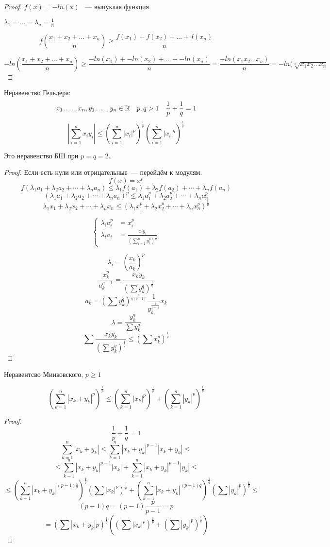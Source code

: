 \begin{proof}
$f(x) = -ln(x)$ ~--- выпуклая функция.

$\lambda_1 = \ldots = \lambda_n = \frac1n$

$$f(\frac{x_1 + x_2 + \ldots + x_n}{n}) \ge \frac{f(x_1) + f(x_2) + \ldots + f(x_n)}{n}$$

$$-ln(\frac{x_1 + x_2 + \ldots + x_n}{n}) \ge \frac{-ln(x_1) + -ln(x_2) + \ldots + -ln(x_n)}{n} = \frac{-ln(x_1x_2\ldots x_n)}{n} = -ln(\sqrt[n]{x_1x_2\ldots x_n}$$


\end{proof}
\begin{conseq}
Неравенство Гельдера:
$$x_1, \ldots, x_n, y_1, \ldots, y_n \in \mathbb{R} \quad p,q > 1 \quad \frac1p + \frac1q = 1$$
$$\left|\sum_{i=1}^n x_iy_i\right| \leqslant \left(\sum_{i=1}^n |x_i|^p\right)^{\frac1p} \left(\sum_{i=1}^n |x_i|^q\right)^{\frac1q}$$
\end{conseq}
\begin{Rem}
Это неравенство БШ при $p=q=2$.
\end{Rem}
\begin{proof}
Если есть нули или отрицательные~--- перейдём к модулям.
$$f(x) = x^p$$
$$f\left( \lambda_1a_1 + \lambda_2a_2 + \cdots + \lambda_n a_n \right) \leqslant \lambda_1f(a_1) + \lambda_2f(a_2) + \cdots + \lambda_nf(a_n)$$
$$\left( \lambda_1a_1 + \lambda_2a_2 + \cdots + \lambda_n a_n \right)^p \leqslant \lambda_1 a_1^p + \lambda_2 a_2^p + \cdots + \lambda_n a_n^p$$
$$\lambda_1x_1 + \lambda_2x_2 + \cdots + \lambda_n x_n \leqslant \left(\lambda_1 x_1^p + \lambda_2 x_2^p + \cdots + \lambda_n x_n^p \right)^{\frac1p}$$

$$ \left\{\begin{aligned}
\lambda_i a_i^p &= x_i^p \\
\lambda_i a_i &= \frac{x_iy_i}{(\sum_{i=1}^n y_i^p) ^ {\frac1q}}
\end{aligned}\right.$$

$$\lambda_i  = (\frac{x_k}{a_k})^p$$ 
$$\frac{x_k^{p}}{a_k^{p - 1}} =\frac{x_k y_k}{(\sum y_k^q)^{\frac1q}} $$
$$a_k = (\sum y_k^q)^{\frac{1}{q(p - 1)}}\frac{1}{y_k^{\frac1{p - 1}}}x_k$$
$$\lambda = \frac{y_k^q}{\sum y_k^q}$$
$$\sum\frac{x_k y_k}{(\sum y_k ^q)^{\frac1q}} \le (\sum x_k^p)^{\frac1p} $$
\end{proof}

\begin{conseq}
Неравентсво Минковского, $p \ge 1$

$$(\sum_{k = 1}^{n}|x_k + y_k|^p)^{\frac1p} \le (\sum_{k = 1}^{n}|x_k|^p)^{\frac{1}{p}} + (\sum_{k = 1}^{n}|y_k|^p)^{\frac{1}{p}}$$
\end{conseq}

\begin{proof}
$$\frac1p + \frac1q = 1$$
$$\sum_{k = 1}^{n}|x_k + y_k| \le \sum_{k = 1}^{n}|x_k + y_k|^{p - 1}|x_k + y_k| \le $$
$$ \le \sum_{k - 1}^{n}|x_k + y_k|^{p - 1}|x_k| + \sum_{k = 1}^{n}|x_k + y_k|^{p - 1}|y_k| \le $$
$$ \le (\sum_{k - 1}^{n}|x_k + y_k|^{(p - 1)q})^{\frac1q}(\sum|x_k|^p)^{\frac{1}{p}} + (\sum_{k = 1}^{n}|x_k + y_k|^{(p - 1)q})^{\frac1q}(\sum|y_k|^p)^{\frac{1}{p}} \le $$
$$ (p - 1)q = (p - 1) \frac{p}{p - 1} = p$$
$$ = (\sum|x_k + y_k|p)^{\frac{1}{q}}((\sum|x_k|^{p})^{\frac1p} + (\sum|y_k|^{p})^{\frac{1}{p}})$$
\end{proof}
